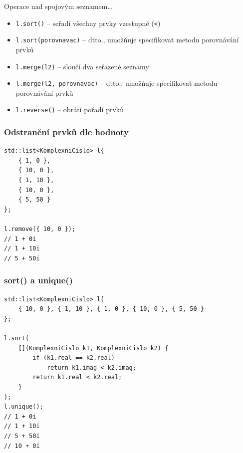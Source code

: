 \begin{frame}[fragile]
\begin{block}{Operace nad spojovým seznamem\ldots}
\begin{itemize}
\item \lstinline|l.sort()| -- seřadí všechny prvky vzestupně (\lstinline|<|)
\item \lstinline|l.sort(porovnavac)| -- dtto., umožňuje specifikovat metodu porovnávání prvků


\item \lstinline|l.merge(l2)| -- sloučí dva seřazené seznamy
\item \lstinline|l.merge(l2, porovnavac)| -- dtto., umožňuje specifikovat metodu porovnávání prvků
\item \lstinline|l.reverse()| -- obrátí pořadí prvků
\end{itemize}
\end{block}
\end{frame}



\begin{frame}[fragile]
\frametitle{Odstranění prvků dle hodnoty}
\begin{yesblock}
\begin{lstlisting}
std::list<KomplexniCislo> l{
	{ 1, 0 },
	{ 10, 0 },
	{ 1, 10 },
	{ 10, 0 },
	{ 5, 50 }
};

l.remove({ 10, 0 });
// 1 + 0i
// 1 + 10i 
// 5 + 50i
\end{lstlisting}
\end{yesblock}
\end{frame}



\begin{frame}[fragile]
\frametitle{sort() a unique()}
\begin{yesblock}
\begin{lstlisting}
std::list<KomplexniCislo> l{
	{ 10, 0 }, { 1, 10 }, { 1, 0 }, { 10, 0 }, { 5, 50 }
};

l.sort(
	[](KomplexniCislo k1, KomplexniCislo k2) {
		if (k1.real == k2.real)
			return k1.imag < k2.imag;
		return k1.real < k2.real;
	}
);
l.unique();
// 1 + 0i
// 1 + 10i 
// 5 + 50i
// 10 + 0i
\end{lstlisting}
\end{yesblock}
\end{frame}



